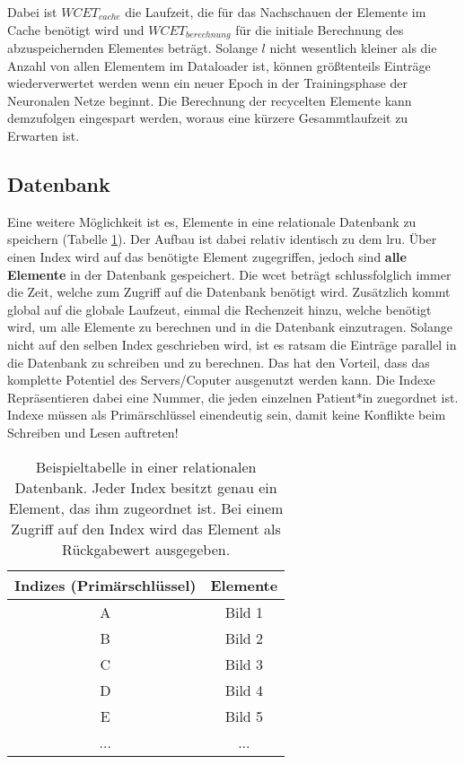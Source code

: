 Dabei ist $WCET_{cache}$ die Laufzeit, die für das Nachschauen der Elemente im Cache benötigt wird und $WCET_{berechnung}$ für die initiale Berechnung des abzuspeichernden Elementes beträgt. Solange $l$ nicht wesentlich kleiner als die Anzahl von allen Elementem im Dataloader ist, können größtenteils Einträge wiederverwertet werden wenn ein neuer Epoch in der Trainingsphase der Neuronalen Netze beginnt. Die Berechnung der recycelten Elemente kann demzufolgen eingespart werden, woraus eine kürzere Gesammtlaufzeit zu Erwarten ist.




\subsection{Datenbank}\label{database}
Eine weitere Möglichkeit ist es, Elemente in eine relationale Datenbank zu speichern (Tabelle \ref{cap:database}). Der Aufbau ist dabei relativ identisch zu dem \ac{lru}. Über einen Index wird auf das benötigte Element zugegriffen, jedoch sind \textbf{alle Elemente} in der Datenbank gespeichert. Die \ac{wcet} beträgt schlussfolglich immer die Zeit, welche zum Zugriff auf die Datenbank benötigt wird. Zusätzlich kommt global auf die globale Laufzeut, einmal die Rechenzeit hinzu, welche benötigt wird, um alle Elemente zu berechnen und in die Datenbank einzutragen. Solange nicht auf den selben Index geschrieben wird, ist es ratsam die Einträge parallel in die Datenbank zu schreiben und zu berechnen. Das hat den Vorteil, dass das komplette Potentiel des Servers/Coputer ausgenutzt werden kann. Die Indexe Repräsentieren dabei eine Nummer, die jeden einzelnen Patient*in zuegordnet ist. Indexe müssen als Primärschlüssel einendeutig sein, damit keine Konflikte beim Schreiben und Lesen auftreten!

\begin{table}[h]\vspace{1ex}\centering
  \begin{tabular*}{9cm}{c|c}
  \textbf{Indizes (Primärschlüssel)} & \textbf{Elemente}
  \\\hline
  A   &  Bild 1 \\
  B   &  Bild 2 \\
  C   &  Bild 3 \\
  D   &  Bild 4 \\
  E   &  Bild 5 \\
  ... & ...

  \\\hline
  \end{tabular*}
  \caption[Beispieltabelle in einer relationalen Datenbank]{Beispieltabelle in einer relationalen Datenbank. Jeder Index besitzt genau ein Element, das ihm zugeordnet ist. Bei einem Zugriff auf den Index wird das Element als Rückgabewert ausgegeben.}\label{cap:database}
\vspace{2ex}\end{table}\label{table:database}


